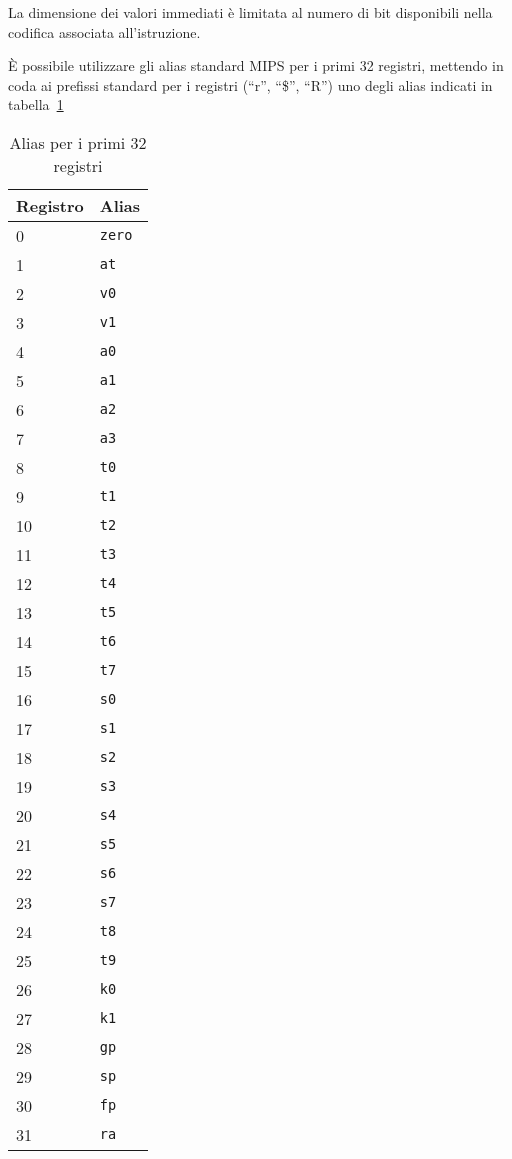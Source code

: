\documentclass[12pt]{report}
\begin{document}
La dimensione dei valori immediati \`{e} limitata al numero di bit disponibili
nella codifica associata all'istruzione. 

\`E possibile utilizzare gli alias standard MIPS per i primi 32 registri,
mettendo in coda ai prefissi standard per i registri (``r'', ``\$'', ``R'') uno
degli alias indicati in tabella~\ref{table:mips32-reg}

\begin{table}[!htb]
	\begin{centering}
		\begin{tabular}{ll}
			\hline
			\hline
			Registro & Alias\\
			\hline
			0 & \texttt{zero}\\
			1 & \texttt{at}\\
			2 & \texttt{v0}\\
			3 & \texttt{v1}\\
			4 & \texttt{a0}\\
			5 & \texttt{a1}\\
			6 & \texttt{a2}\\
			7 & \texttt{a3}\\
			8 & \texttt{t0}\\
			9 & \texttt{t1}\\
			10 & \texttt{t2}\\
			11 & \texttt{t3}\\
			12 & \texttt{t4}\\
			13 & \texttt{t5}\\
			14 & \texttt{t6}\\
			15 & \texttt{t7}\\
			16 & \texttt{s0}\\
			17 & \texttt{s1}\\
			18 & \texttt{s2}\\
			19 & \texttt{s3}\\
			20 & \texttt{s4}\\
			21 & \texttt{s5}\\
			22 & \texttt{s6}\\
			23 & \texttt{s7}\\
			24 & \texttt{t8}\\
			25 & \texttt{t9}\\
			26 & \texttt{k0}\\
			27 & \texttt{k1}\\
			28 & \texttt{gp}\\
			29 & \texttt{sp}\\
			30 & \texttt{fp}\\
			31 & \texttt{ra}\\
		\end{tabular}
		\caption{Alias per i primi 32 registri}
		\label{table:mips32-reg}
	\end{centering}
\end{table}
\end{document}
